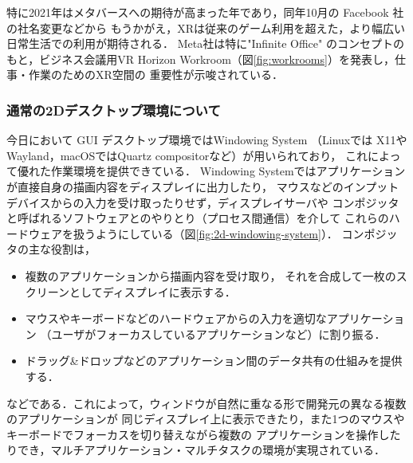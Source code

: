 特に2021年はメタバースへの期待が高まった年であり，同年10月の Facebook 社の社名変更などから
もうかがえ，XRは従来のゲーム利用を超えた，より幅広い日常生活での利用が期待される．
Meta社は特に"Infinite Office" のコンセプトのもと，ビジネス会議用VR
Horizon Workroom（図\ref{fig:workrooms}）を発表し，仕事・作業のためのXR空間の
重要性が示唆されている．


\subsubsection{通常の2Dデスクトップ環境について}

今日において GUI デスクトップ環境ではWindowing System
（Linuxでは X11やWayland，macOSではQuartz compositorなど）が用いられており，
これによって優れた作業環境を提供できている．
Windowing Systemではアプリケーションが直接自身の描画内容をディスプレイに出力したり，
マウスなどのインプットデバイスからの入力を受け取ったりせず，ディスプレイサーバや
コンポジッタと呼ばれるソフトウェアとのやりとり（プロセス間通信）を介して
これらのハードウェアを扱うようにしている（図\ref{fig:2d-windowing-system}）．
コンポジッタの主な役割は，
\begin{itemize}
  \item 複数のアプリケーションから描画内容を受け取り，
        それを合成して一枚のスクリーンとしてディスプレイに表示する．
  \item マウスやキーボードなどのハードウェアからの入力を適切なアプリケーション
        （ユーザがフォーカスしているアプリケーションなど）に割り振る．
  \item ドラッグ\&ドロップなどのアプリケーション間のデータ共有の仕組みを提供する．
\end{itemize}
などである．これによって，ウィンドウが自然に重なる形で開発元の異なる複数のアプリケーションが
同じディスプレイ上に表示できたり，また1つのマウスやキーボードでフォーカスを切り替えながら複数の
アプリケーションを操作したりでき，マルチアプリケーション・マルチタスクの環境が実現されている．

